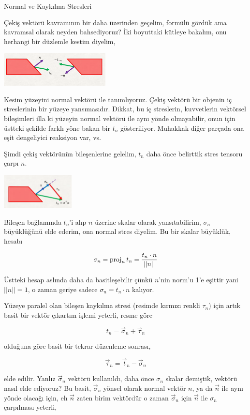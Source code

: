 \documentclass[12pt,fleqn]{article}\usepackage{../../common}
\begin{document}
Normal ve Kaykılma Stresleri

Çekiş vektörü kavramının bir daha üzerinden geçelim, formülü gördük ama
kavramsal olarak neyden bahsediyoruz? İki boyuttaki kütleye bakalım, onu
herhangi bir düzlemle kestim diyelim, 

\includegraphics[width=15em]{phy_020_strs_02_06.png}

Kesim yüzeyini normal vektörü ile tanımlıyoruz. Çekiş vektörü bir objenin iç
streslerinin bir yüzeye yansımasıdır. Dikkat, bu iç streslerin, kuvvetlerin
vektörsel bileşimleri illa ki yüzeyin normal vektörü ile aynı yönde olmayabilir,
onun için üstteki şekilde farklı yöne bakan bir $t_n$ gösteriliyor. Muhakkak
diğer parçada ona eşit dengeliyici reaksiyon var, vs.

Şimdi çekiş vektörünün bileşenlerine gelelim, $t_n$ daha önce belirttik stres
tensoru çarpı $n$. 

\includegraphics[width=10em]{phy_020_strs_02_07.png}

Bileşen bağlamında $t_n$'i alıp $n$ üzerine skalar olarak yansıtabilirim,
$\sigma_n$ büyüklüğünü elde ederim, ona normal stres diyelim. Bu bir skalar
büyüklük, hesabı

$$
\sigma_n = \operatorname{proj}_n t_n = \frac{t_n \cdot n}{||n||}
$$

Üstteki hesap aslında daha da basitleşebilir çünkü $n$'nin norm'u 1'e
eşittir yani $||n||=1$, o zaman geriye sadece $\sigma_n = t_n \cdot n$
kalıyor.

Yüzeye paralel olan bileşen kaykılma stresi (resimde kırmızı renkli $\tau_n$)
için artık basit bir vektör çıkartım işlemi yeterli, resme göre

$$
t_n = \vec{\sigma}_n + \vec{\tau}_n 
$$

olduğuna göre basit bir tekrar düzenleme sonrası,

$$
\vec{\tau}_n  = \vec{t}_n - \vec{\sigma}_n 
$$

elde edilir. Yanlız $\vec{\sigma}_n$ vektörü kullanıldı, daha önce $\sigma_n$
skalar demiştik, vektörü nasıl elde ediyoruz? Bu basit, $\vec{\sigma}_n$
yönsel olarak normal vektör $n$, ya da $\vec{n}$ ile aynı yönde olacağı
için, eh $\vec{n}$ zaten birim vektördür o zaman $\vec{\sigma}_n$ için
$\vec{n}$ ile $\sigma_n$ çarpılması yeterli,
\end{document}
